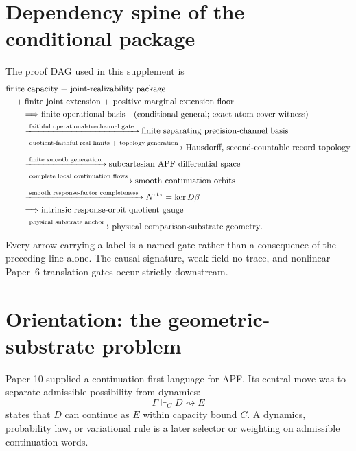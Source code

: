 \documentclass[11pt]{article}
\theoremstyle{remark}
\newcommand{\G}{\Gamma}
\newcommand{\entails}{\Vdash}
\newcommand{\goes}{\rightsquigarrow}
\begin{document}
\section{Dependency spine of the conditional package}\label{sec:ts-dag}
The proof DAG used in this supplement is
\[
\begin{aligned}
&\text{finite capacity + joint-realizability package}\\
&\quad+\text{finite joint extension + positive marginal extension floor}\\
&\qquad\Longrightarrow \text{finite operational basis}
\quad\text{(conditional general; exact atom-cover witness)}\\
&\qquad\xrightarrow{\;\text{faithful operational-to-channel gate}\;}
\text{finite separating precision-channel basis}\\
&\qquad\xrightarrow{\;\text{quotient-faithful real limits + topology generation}\;}
\text{Hausdorff, second-countable record topology}\\
&\qquad\xrightarrow{\;\text{finite smooth generation}\;}
\text{subcartesian APF differential space}\\
&\qquad\xrightarrow{\;\text{complete local continuation flows}\;}
\text{smooth continuation orbits}\\
&\qquad\xrightarrow{\;\text{smooth response-factor completeness}\;}
N^{\rm ctx}=\ker D\beta\\
&\qquad\Longrightarrow \text{intrinsic response-orbit quotient gauge}\\
&\qquad\xrightarrow{\;\text{physical substrate anchor}\;}
\text{physical comparison-substrate geometry}.
\end{aligned}
\]
Every arrow carrying a label is a named gate rather than a consequence of the
preceding line alone.  The causal-signature, weak-field no-trace, and nonlinear
Paper~6 translation gates occur strictly downstream.

\section{Orientation: the geometric-substrate problem}

Paper 10 supplied a continuation-first language for APF.  Its central move was to separate admissible possibility from dynamics:
\[
        \G\entails_C D\goes E
\]
states that \(D\) can continue as \(E\) within capacity bound \(C\).  A dynamics, probability law, or variational rule is a later selector or weighting on admissible continuation words.
\end{document}
